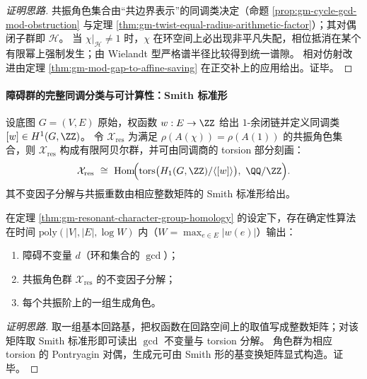\begin{proof}[证明思路]
共振角色集合由“共边界表示”的同调类决定（命题 \ref{prop:gm-cycle-gcd-mod-obstruction} 与定理 \ref{thm:gm-twist-equal-radius-arithmetic-factor}）；其对偶闭子群即 \(\mathcal{H}\)。
当 \(\chi|_{\mathcal{H}}\neq 1\) 时，\(\chi\) 在环空间上必出现非平凡失配，相位抵消在某个有限幂上强制发生；由 Wielandt 型严格谱半径比较得到统一谱隙。
相对仿射改进由定理 \ref{thm:gm-mod-gap-to-affine-saving} 在正交补上的应用给出。证毕。
\end{proof}

\paragraph{障碍群的完整同调分类与可计算性：Smith 标准形}
\begin{theorem}\label{thm:gm-resonant-character-group-homology}
设底图 \(G=(V,E)\) 原始，权函数 \(w:E\to\ZZ\) 给出 \(1\)-余闭链并定义同调类 \([w]\in H^1(G,\ZZ)\)。
令 \(\mathcal{X}_{\mathrm{res}}\) 为满足 \(\rho(A(\chi))=\rho(A(1))\) 的共振角色集合，则 \(\mathcal{X}_{\mathrm{res}}\) 构成有限阿贝尔群，并可由同调商的 torsion 部分刻画：
\[
\mathcal{X}_{\mathrm{res}}\ \cong\ \mathrm{Hom}\!\Bigl(\mathrm{tors}\bigl(H_1(G,\ZZ)/\langle[w]\rangle\bigr),\ \QQ/\ZZ\Bigr).
\]
其不变因子分解与共振重数由相应整数矩阵的 Smith 标准形给出。
\end{theorem}

\begin{proposition}\label{prop:gm-smith-compute-obstructions}
在定理 \ref{thm:gm-resonant-character-group-homology} 的设定下，存在确定性算法在时间 \(\mathrm{poly}(|V|,|E|,\log W)\) 内（\(W=\max_{e\in E}|w(e)|\)）输出：
\begin{enumerate}
  \item 障碍不变量 \(d\)（环和集合的 \(\gcd\)）；
  \item 共振角色群 \(\mathcal{X}_{\mathrm{res}}\) 的不变因子分解；
  \item 每个共振阶上的一组生成角色。
\end{enumerate}
\end{proposition}

\begin{proof}[证明思路]
取一组基本回路基，把权函数在回路空间上的取值写成整数矩阵；对该矩阵取 Smith 标准形即可读出 \(\gcd\) 不变量与 torsion 分解。
角色群为相应 torsion 的 Pontryagin 对偶，生成元可由 Smith 形的基变换矩阵显式构造。证毕。
\end{proof}

